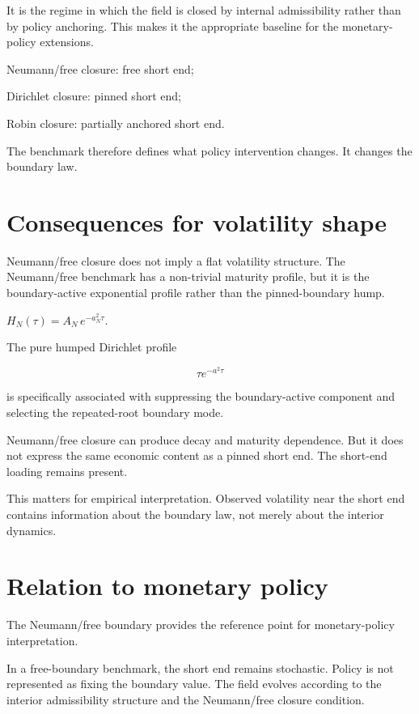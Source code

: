 \documentclass[11pt,oneside]{book}
\begin{document}
It is the regime in which the field is closed by internal admissibility
rather than by policy anchoring. This makes it the appropriate baseline
for the monetary-policy extensions.

Neumann/free closure: free short end;

Dirichlet closure: pinned short end;

Robin closure: partially anchored short end.

The benchmark therefore defines what policy intervention changes. It
changes the boundary law.

\section{Consequences for volatility
shape}\label{consequences-for-volatility-shape}

Neumann/free closure does not imply a flat volatility structure. The
Neumann/free benchmark has a non-trivial maturity profile, but it is the
boundary-active exponential profile rather than the pinned-boundary
hump.

$H_N(\tau)=A_N\,e^{-a_N^2\tau}$.

The pure humped Dirichlet profile

\[
\tau e^{-a^2\tau}
\]

is specifically associated with suppressing the boundary-active
component and selecting the repeated-root boundary mode.

Neumann/free closure can produce decay and maturity dependence. But it does
not express the same economic content as a pinned short end. The
short-end loading remains present.

This matters for empirical interpretation. Observed volatility near the
short end contains information about the boundary law, not merely about
the interior dynamics.

\section{Relation to monetary
policy}\label{relation-to-monetary-policy}

The Neumann/free boundary provides the reference point for monetary-policy
interpretation.

In a free-boundary benchmark, the short end remains stochastic. Policy
is not represented as fixing the boundary value. The field evolves
according to the interior admissibility structure and the Neumann/free
closure condition.
\end{document}
